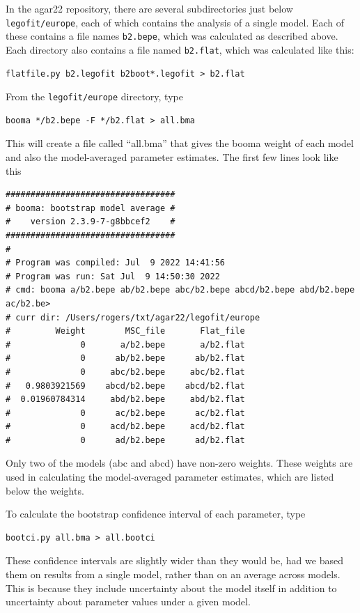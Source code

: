\documentclass[11pt]{article}
\begin{document}
In the agar22 repository, there are several subdirectories just below
\texttt{legofit/europe}, each of which contains the analysis of a
single model. Each of these contains a file names \texttt{b2.bepe},
which was calculated as described above. Each directory also contains
a file named \texttt{b2.flat}, which was calculated like this:
\begin{verbatim}
flatfile.py b2.legofit b2boot*.legofit > b2.flat
\end{verbatim}
From the \texttt{legofit/europe} directory, type
\begin{verbatim}
booma */b2.bepe -F */b2.flat > all.bma
\end{verbatim}
This will create a file called ``all.bma'' that gives the booma weight
of each model and also the model-averaged parameter estimates. The
first few lines look like this
\begin{verbatim}
##################################
# booma: bootstrap model average #
#    version 2.3.9-7-g8bbcef2    #
##################################
#
# Program was compiled: Jul  9 2022 14:41:56
# Program was run: Sat Jul  9 14:50:30 2022
# cmd: booma a/b2.bepe ab/b2.bepe abc/b2.bepe abcd/b2.bepe abd/b2.bepe ac/b2.be>
# curr dir: /Users/rogers/txt/agar22/legofit/europe
#         Weight        MSC_file       Flat_file
#              0       a/b2.bepe       a/b2.flat
#              0      ab/b2.bepe      ab/b2.flat
#              0     abc/b2.bepe     abc/b2.flat
#   0.9803921569    abcd/b2.bepe    abcd/b2.flat
#  0.01960784314     abd/b2.bepe     abd/b2.flat
#              0      ac/b2.bepe      ac/b2.flat
#              0     acd/b2.bepe     acd/b2.flat
#              0      ad/b2.bepe      ad/b2.flat
\end{verbatim}
Only two of the models (abc and abcd) have non-zero weights.  These
weights are used in calculating the model-averaged parameter
estimates, which are listed below the weights.

To calculate the bootstrap confidence interval of each parameter, type
\begin{verbatim}
bootci.py all.bma > all.bootci
\end{verbatim}
These confidence intervals are slightly wider than they would be, had
we based them on results from a single model, rather than on an
average across models. This is because they include uncertainty about
the model itself in addition to uncertainty about parameter values
under a given model.
\end{document}
